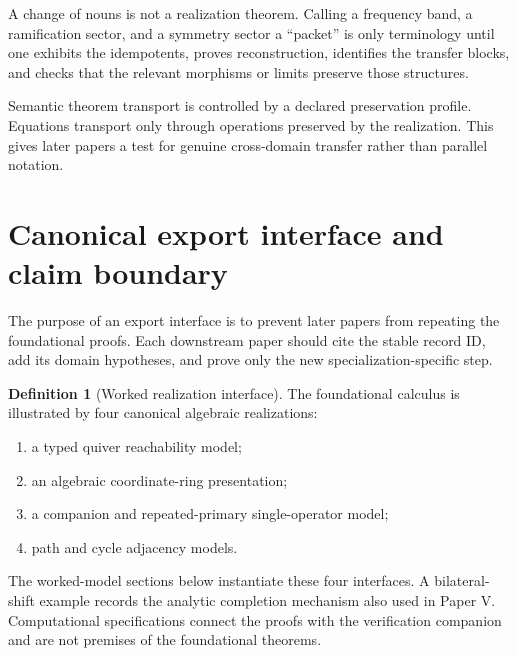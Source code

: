 \documentclass[11pt]{article}
\theoremstyle{definition}
\newtheorem{definition}[definition]{Definition}
\theoremstyle{remark}
\theoremstyle{definition}\newtheorem{example}[theorem]{Example}
\newcommand{\RecordID}[1]{\label{record:#1}}
\begin{document}
\begin{warningbox}
A change of nouns is not a realization theorem.  Calling a frequency band, a ramification sector, and a symmetry sector a ``packet'' is only terminology until one exhibits the idempotents, proves reconstruction, identifies the transfer blocks, and checks that the relevant morphisms or limits preserve those structures.
\end{warningbox}

\begin{sectionrecap}
Semantic theorem transport is controlled by a declared preservation profile.  Equations transport only through operations preserved by the realization.  This gives later papers a test for genuine cross-domain transfer rather than parallel notation.
\end{sectionrecap}


\section{Canonical export interface and claim boundary}
\begin{readerroadmap}
The purpose of an export interface is to prevent later papers from repeating the foundational proofs.  Each downstream paper should cite the stable record ID, add its domain hypotheses, and prove only the new specialization-specific step.
\end{readerroadmap}

\begin{definition}[Worked realization interface]
\label{def:reserved-example-slots}
The foundational calculus is illustrated by four canonical algebraic realizations:
\begin{enumerate}[label=(\roman*)]
\item a typed quiver reachability model;
\item an algebraic coordinate-ring presentation;
\item a companion and repeated-primary single-operator model;
\item path and cycle adjacency models.
\end{enumerate}
The worked-model sections below instantiate these four interfaces. A bilateral-shift example records the analytic completion mechanism also used in Paper V. Computational specifications connect the proofs with the verification companion and are not premises of the foundational theorems.
\end{definition}
\RecordID{PSC-I-ALG-EXAMPLE-SLOTS}
\end{document}
